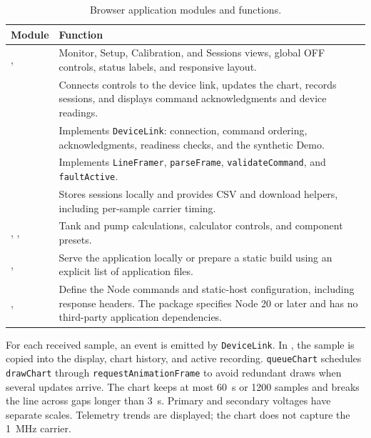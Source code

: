 \begin{table}[htbp]
\centering
\caption{Browser application modules and functions.}
\label{tab:app-browser-modules}
\small
\begin{tabularx}{\textwidth}{@{}L{0.24\textwidth}Y@{}}
\toprule
Module & Function\\
\midrule
{},  & Monitor, Setup, Calibration, and Sessions views, global OFF controls, status labels, and responsive layout.\\
 & Connects controls to the device link, updates the chart, records sessions, and displays command acknowledgments and device readings.\\
 & Implements \texttt{DeviceLink}: connection, command ordering, acknowledgments, readiness checks, and the synthetic Demo.\\
 & Implements \texttt{LineFramer}, \texttt{parseFrame}, \texttt{validateCommand}, and \texttt{faultActive}.\\
 & Stores sessions locally and provides CSV and download helpers, including per-sample carrier timing.\\
, ,  & Tank and pump calculations, calculator controls, and component presets.\\
,  & Serve the application locally or prepare a static build using an explicit list of application files.\\
,  & Define the Node commands and static-host configuration, including response headers. The package specifies Node 20 or later and has no third-party application dependencies.\\
\bottomrule
\end{tabularx}
\end{table}
\FloatBarrier

For each received sample, an event is emitted by \texttt{DeviceLink}. In
, the sample is copied into the display, chart history,
and active recording. \texttt{queueChart} schedules \texttt{drawChart}
through \texttt{requestAnimationFrame} to avoid redundant draws when
several updates arrive. The chart keeps at most \SI{60}{\second} or 1200
samples and breaks the line across gaps longer than \SI{3}{\second}.
Primary and secondary voltages have separate scales. Telemetry trends are displayed; the chart does not capture the \SI{1}{\mega\hertz} carrier.


